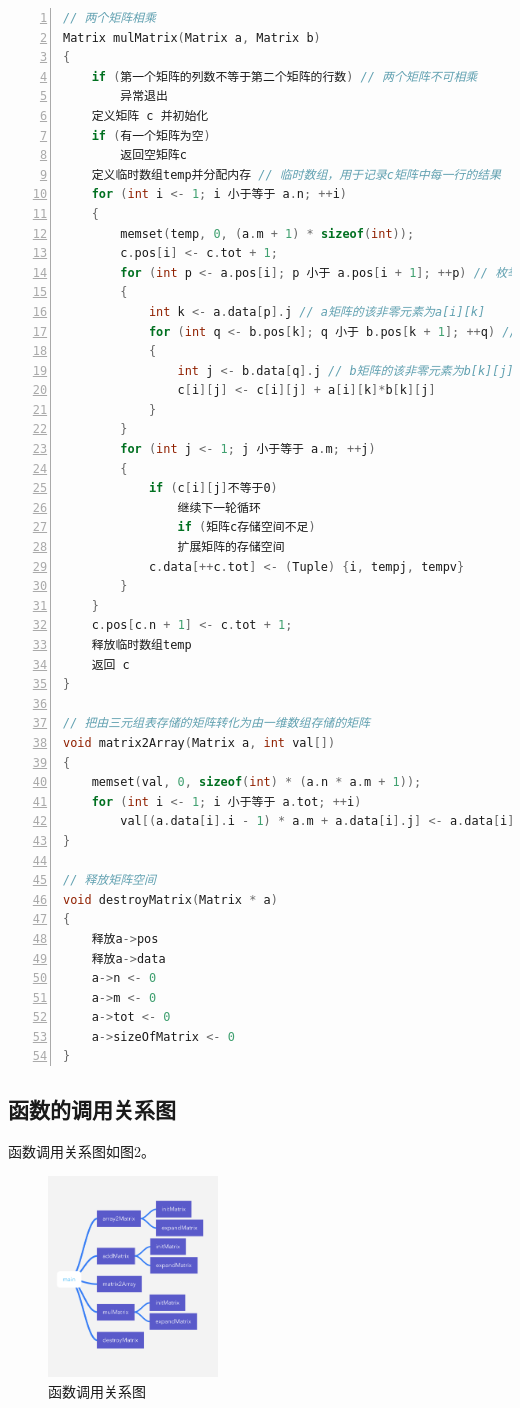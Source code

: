 \documentclass{article}
\begin{document}
\begin{lstlisting}[language={C},
    numbers=left,
    numberstyle=\tiny\consolas,
    basicstyle=\small\consolas]
// 两个矩阵相乘
Matrix mulMatrix(Matrix a, Matrix b)
{
    if (第一个矩阵的列数不等于第二个矩阵的行数) // 两个矩阵不可相乘
        异常退出
    定义矩阵 c 并初始化
    if (有一个矩阵为空)
        返回空矩阵c
    定义临时数组temp并分配内存 // 临时数组，用于记录c矩阵中每一行的结果
    for (int i <- 1; i 小于等于 a.n; ++i)
    {
        memset(temp, 0, (a.m + 1) * sizeof(int));
        c.pos[i] <- c.tot + 1;
        for (int p <- a.pos[i]; p 小于 a.pos[i + 1]; ++p) // 枚举a矩阵第i行的非零元素
        {
            int k <- a.data[p].j // a矩阵的该非零元素为a[i][k]
            for (int q <- b.pos[k]; q 小于 b.pos[k + 1]; ++q) // 枚举b矩阵第k行的非零元素
            {
                int j <- b.data[q].j // b矩阵的该非零元素为b[k][j]
                c[i][j] <- c[i][j] + a[i][k]*b[k][j]
            }
        }
        for (int j <- 1; j 小于等于 a.m; ++j)
        {
            if (c[i][j]不等于0) 
                继续下一轮循环
                if (矩阵c存储空间不足)
                扩展矩阵的存储空间
            c.data[++c.tot] <- (Tuple) {i, tempj, tempv}
        }
    }
    c.pos[c.n + 1] <- c.tot + 1;
    释放临时数组temp
    返回 c
}

// 把由三元组表存储的矩阵转化为由一维数组存储的矩阵
void matrix2Array(Matrix a, int val[])
{
    memset(val, 0, sizeof(int) * (a.n * a.m + 1));
    for (int i <- 1; i 小于等于 a.tot; ++i)
        val[(a.data[i].i - 1) * a.m + a.data[i].j] <- a.data[i].val; // a[i][j]存储在val[(i-1]*m+j]中
}

// 释放矩阵空间
void destroyMatrix(Matrix * a)
{
    释放a->pos
    释放a->data
    a->n <- 0
    a->m <- 0
    a->tot <- 0
    a->sizeOfMatrix <- 0
}

\end{lstlisting}

\subsection{函数的调用关系图}

函数调用关系图如图2。

\begin{figure}[htbp]
    
    \centering\includegraphics[width=0.4\textwidth]{./Images/pic3_2.png}
    
    \caption{函数调用关系图}
    
\end{figure}
\end{document}

